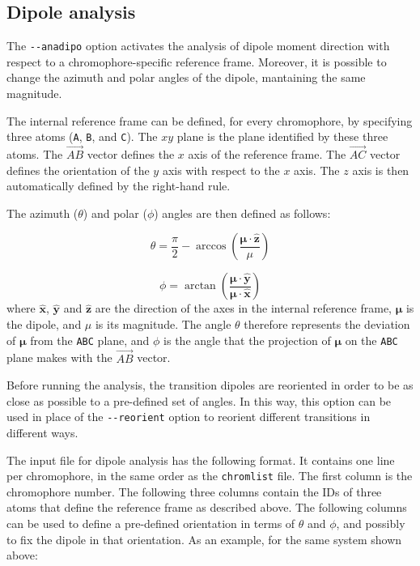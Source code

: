 \documentclass[a4paper,11pt]{article}
\newcommand{\bs}{\boldsymbol}
\begin{document}
\subsection{Dipole analysis}\label{sec:anadipo}

The \texttt{-{}-anadipo} option activates the analysis of dipole moment direction with respect to a chromophore-specific reference frame. Moreover, it is possible to change the azimuth and polar angles of the dipole, mantaining the same magnitude.

The internal reference frame can be defined, for every chromophore, by specifying three atoms (\texttt{A}, \texttt{B}, and \texttt{C}). The $xy$ plane is the plane identified by these three atoms. The $\vec{AB}$ vector defines the $x$ axis of the reference frame. The $\vec{AC}$ vector defines the orientation of the $y$ axis with respect to the $x$ axis. The $z$ axis is then automatically defined by the right-hand rule. 

The azimuth ($\theta$) and polar ($\phi$) angles are then defined as follows: 

\begin{equation}\label{eq:deftheta}
 \theta = \dfrac{\pi}{2} - \arccos\left(\dfrac{\bs{\mu}\cdot\hat{\mathbf{z}}}{\mu}\right)
\end{equation}

\begin{equation}\label{eq:defphi}
 \phi = \arctan\left(\dfrac{\bs{\mu}\cdot\hat{\mathbf{y}}}{\bs{\mu}\cdot\hat{\mathbf{x}}}\right)
\end{equation}
where $\hat{\mathbf{x}}$, $\hat{\mathbf{y}}$ and $\hat{\mathbf{z}}$ are the direction of the axes in the internal reference frame, $\bs{\mu}$ is the dipole, and $\mu$ is its magnitude. The angle $\theta$ therefore represents the deviation of $\bs{\mu}$ from the \texttt{ABC} plane, and $\phi$ is the angle that the projection of $\bs{\mu}$ on the \texttt{ABC} plane makes with the $\vec{AB}$ vector. 

Before running the analysis, the transition dipoles are reoriented in order to be as close as possible to a pre-defined set of angles. In this way, this option can be used in place of the \texttt{-{}-reorient} option to reorient different transitions in different ways.

The input file for dipole analysis has the following format. It contains one line per chromophore, in the same order as the \texttt{chromlist} file. The first column is the chromophore number. The following three columns contain the IDs of three atoms that define the reference frame as described above. The following columns can be used to define a pre-defined orientation in terms of $\theta$ and $\phi$, and possibly to fix the dipole in that orientation. As an example, for the same system shown above: 
\end{document}
